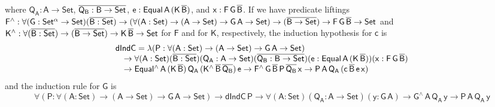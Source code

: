 \documentclass[9pt]{entcs}
\begin{document}
\noindent
where $\mathsf{Q_A : A \to Set}$, $\overline{\mathsf{Q_B : B \to Set}}$,
$\mathsf{e : Equal\,A\,(K\,\overline{B})}$, and $\mathsf{x : F\,G\,\overline{B}}$.
If we have predicate liftings $\mathsf{F^{\wedge}} : \mathsf{\forall (G
  : Set^{\alpha} \to Set) (\overline{B : Set}) \to (\forall (A : Set) \to (A
  \to Set) \to G\,A \to Set) \to (\overline{B \to Set}) \to F\,G\,\overline{B} \to
  Set}$ and $\mathsf{K^{\wedge}} : \mathsf{\forall (\overline{B : Set}) \to
  (\overline{B \to Set}) \to K\,\overline{B} \to Set}$
for $\mathsf{F}$ and for $\mathsf{K}$, respectively, the induction
hypothesis for $\mathsf{c}$ is
\[\begin{array}{l}
\mathsf{dIndC = \lambda (P : \forall (A : Set) \to (A \to Set) \to
  G\,A \to Set)}\\
\quad \mathsf{\to \forall (A : Set) (\overline{B : Set}) (Q_A : A \to Set)
  (\overline{Q_B : B \to Set}) (e : Equal\,A\,(K\,\overline{B})) (x :
  F\,G\,\overline{B})} \\ 
\quad \mathsf{\to
  Equal^{\wedge}\,A\,(K\,\overline{B})\,Q_A\,(K^{\wedge}\,\overline{B}\,\overline{Q_B})\,e
  \to F^{\wedge}\,G\,\overline{B}\,P\,\overline{Q_B}\,x \to
  P\,A\,Q_A\,(c\,\overline{B}\,e\,x)} 
\end{array}\]
and the induction rule for $\mathsf{G}$ is
\[
\mathsf{\forall (P : \forall (A : Set) \to (A \to Set) \to G\,A \to
  Set) \to dIndC\,P \to \forall (A : Set)(Q_A : A \to Set)(y : G\,A)
\to G^{\wedge}\,A\,Q_A\,y \to P\,A\,Q_A\,y} \]
\end{document}
